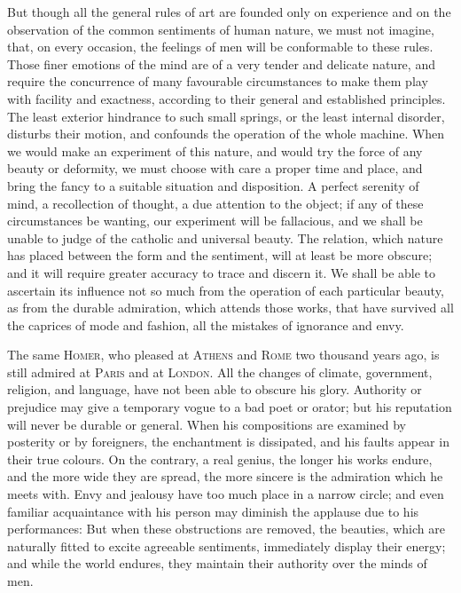 But though all the general rules of art are founded only on experience
and on the observation of the common sentiments of human nature, we
must not imagine, that, on every occasion, the feelings of men will be
conformable to these rules. Those finer emotions of the mind are of a
very tender and delicate nature, and require the concurrence of many
favourable circumstances to make them play with facility and
exactness, according to their general and established principles. The
least exterior hindrance to such small springs, or the least internal
disorder, disturbs their motion, and confounds the operation of the
whole machine. When we would make an experiment of this nature, and
would try the force of any beauty or deformity, we must choose with
care a  proper time and place, and bring the fancy to a
suitable situation and disposition. A perfect serenity of mind, a
recollection of thought, a due attention to the object; if any of
these circumstances be wanting, our experiment will be fallacious, and
we shall be unable to judge of the catholic and universal beauty. The
relation, which nature has placed between the form and the sentiment,
will at least be more obscure; and it will require greater accuracy to
trace and discern it. We shall be able to ascertain its influence not
so much from the operation of each particular beauty, as from the
durable admiration, which attends those works, that have survived all
the caprices of mode and fashion, all the mistakes of ignorance and
envy.

The same \textsc{Homer}, who pleased at \textsc{Athens} and
\textsc{Rome} two thousand years ago, is still admired at
\textsc{Paris} and at \textsc{London}. All the changes of climate,
government, religion, and language, have not been able to obscure his
glory. Authority or prejudice may give a temporary vogue to a bad poet
or orator; but his reputation will never be durable or general. When
his compositions are examined by posterity or by foreigners, the
enchantment is dissipated, and his faults appear in their true
colours. On the contrary, a real genius, the longer his works endure,
and the more wide they are spread, the more sincere is the admiration
which he meets with. Envy and jealousy have too much place in a narrow
circle; and even familiar acquaintance with his person may diminish
the applause due to his performances: But when these obstructions are
removed, the beauties, which are naturally fitted to excite agreeable
sentiments, immediately display their energy; and while the world
endures, they maintain their authority over the minds of men.

